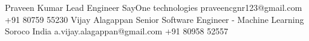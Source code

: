 %
%
%


\begin{referees}
		{Praveen Kumar}
		{Lead Engineer}
		{SayOne technologies}
		{praveencgnr123@gmail.com}
		{+91 80759 55230}
		{Vijay Alagappan}
		{Senior Software Engineer - Machine Learning}
		{Soroco India}
		{a.vijay.alagappan@gmail.com}
		{+91 80958 52557}
\end{referees}